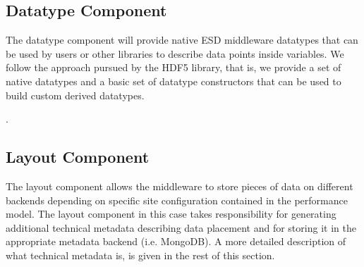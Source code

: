 \documentclass{../../template/esiwace-report}
\begin{document}
\subsection{Datatype Component}
The datatype component will provide native ESD middleware datatypes that can be used by users or other libraries to describe data points inside variables. We follow the approach pursued by the HDF5 library, that is, we provide a set of native datatypes and a basic set of datatype constructors that can be used to build custom derived datatypes. 



.

\subsection{Layout Component}
The layout component allows the middleware to store pieces of data on different backends depending on specific site configuration contained in the performance model. The layout component in this case takes responsibility for generating additional technical metadata describing data placement and for storing it in the appropriate metadata backend (i.e. MongoDB). A more detailed description of what technical metadata is, is given in the rest of this section.
\end{document}

